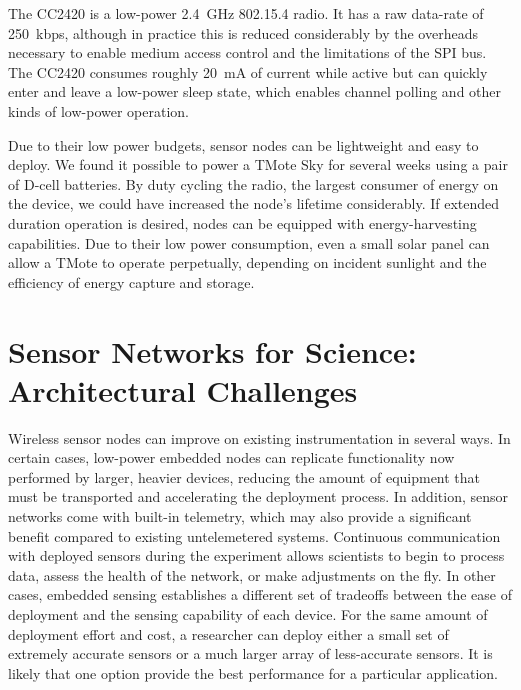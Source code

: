 The CC2420 is a low-power 2.4~GHz 802.15.4 radio. It has a raw data-rate of
250~kbps, although in practice this is reduced considerably by the overheads
necessary to enable medium access control and the limitations of the SPI bus.
The CC2420 consumes roughly 20~mA of current while active but can quickly
enter and leave a low-power sleep state, which enables channel polling and
other kinds of low-power operation.

\clearpage

Due to their low power budgets, sensor nodes can be lightweight and easy to
deploy. We found it possible to power a TMote Sky for several weeks using a
pair of D-cell batteries. By duty cycling the radio, the largest consumer of
energy on the device, we could have increased the node's lifetime
considerably. If extended duration operation is desired, nodes can be
equipped with energy-harvesting capabilities. Due to their low power
consumption, even a small solar panel can allow a TMote to operate
perpetually, depending on incident sunlight and the efficiency of energy
capture and storage.

\section{Sensor Networks for Science: Architectural Challenges}

Wireless sensor nodes can improve on existing instrumentation in several
ways. In certain cases, low-power embedded nodes can replicate functionality
now performed by larger, heavier devices, reducing the amount of equipment
that must be transported and accelerating the deployment process. In
addition, sensor networks come with built-in telemetry, which may also
provide a significant benefit compared to existing untelemetered systems.
Continuous communication with deployed sensors during the experiment allows
scientists to begin to process data, assess the health of the network, or
make adjustments on the fly. In other cases, embedded sensing establishes a
different set of tradeoffs between the ease of deployment and the sensing
capability of each device. For the same amount of deployment effort and cost,
a researcher can deploy either a small set of extremely accurate sensors or a
much larger array of less-accurate sensors. It is likely that one option
provide the best performance for a particular application.

